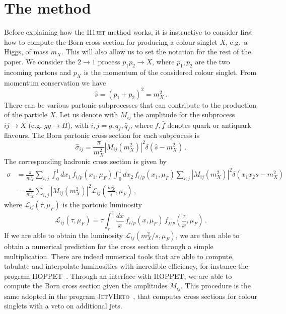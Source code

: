 \documentclass[12pt]{article}
\begin{document}
\section{The method}
\label{sec:method}
Before explaining how the \textsc{H1jet} method works, it is instructive to
consider first how to compute the Born cross section for producing a
colour singlet $X$, e.g.\ a Higgs, of mass $m_X$. This will also allow
us to set the notation for the rest of the paper. We consider the
$2\to 1$ process $p_1 p_2 \to X$, where $p_1,p_2$ are the two incoming
partons and $p_X$ is the momentum of the considered colour
singlet. From momentum conservation we have 
\begin{equation}
  \label{eq:mom-conservation}
  \hat s = (p_1+p_2)^2=m_X^2\,.
\end{equation}
There can be various partonic subprocesses that can contribute to the
production of the particle $X$. Let us denote with $M_{ij}$ the
amplitude for the subprocess $ij\to X$ (e.g. $gg \to H$), with
$i,j=g,q_f,\bar q_{\bar f}$, where $f,\bar f$ denotes quark or
antiquark flavours. The Born partonic cross section for each
subprocess is
\begin{equation}
  \label{eq:Born-xsct}
  \hat\sigma_{ij}=\frac{\pi}{m_X^2} |M_{ij}(m_X^2)|^2 \delta\left(\hat s-m_X^2\right)\,.
\end{equation}
The corresponding hadronic cross section is given by
\begin{equation}
  \label{eq:Born-had}
  \begin{split}
  \sigma& =\frac{\pi}{m_X^2}\sum_{i,j} \int_0^1 dx_1\, f_{i/p}(x_1,\mu_F)\int_0^1 dx_2 \, f_{i/p}(x_1,\mu_F)\sum_{i,j}
 |M_{ij}(m_X^2)|^2 \delta\left(x_1 x_2 s-m_X^2\right)\\
   & = \frac{\pi}{m_X^4} \sum_{i,j} |M_{ij}(m_X^2)|^2 \mathcal{L}_{ij}\left(\frac{m_X^2}{s},\mu_F\right)
  \,,
    \end{split}
\end{equation}
where $\mathcal{L}_{ij}\left(\tau,\mu_F\right)$ is the partonic luminosity
\begin{equation}
  \label{eq:hoppet-lumi}
  \mathcal{L}_{ij}\left(\tau,\mu_F\right) = \tau \int_\tau^1 \frac{dx}{x}\, f_{i/p}(x,\mu_F)\, f_{j/p}\left(\frac{\tau}{x},\mu_F\right)\,.
\end{equation}
If we are able to obtain the luminosity
$\mathcal{L}_{ij}\left(m_X^2/s,\mu_F\right)$, we are then able to
obtain a numerical prediction for the cross section through a simple
multiplication. There are indeed numerical tools that are able to
compute, tabulate and interpolate luminosities with incredible
efficiency, for instance the program
\textsc{HOPPET}~\cite{Salam:2008qg}. Through an interface with \textsc{HOPPET}, we are
able to compute the Born cross section given the amplitudes
$M_{ij}$. This procedure is the same adopted in the program
\textsc{JetVHeto}~\cite{Banfi:2015pju}, that computes cross sections for colour
singlets with a veto on additional jets.
\end{document}

